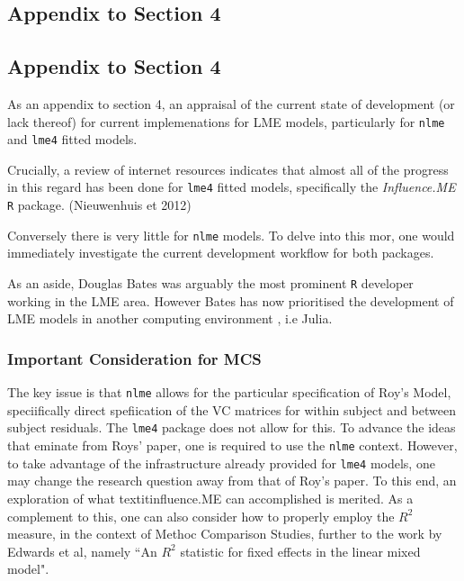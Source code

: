 \documentclass[12pt, a4paper]{article}
\begin{document}
\subsection*{Appendix to Section 4}



\subsection*{Appendix to Section 4}

As an appendix to section 4, an appraisal of the current state of development (or lack thereof) for current implemenations for LME models, particularly for
\texttt{nlme} and \texttt{lme4} fitted models.

Crucially, a review of internet resources indicates that almost all of the progress in this regard has been done for \texttt{lme4} fitted models, specifically the \textit{Influence.ME} \texttt{R} package. (Nieuwenhuis et 2012)

Conversely there is very little for \texttt{nlme} models. To delve into this mor, one would immediately investigate the current development workflow for both packages.

As an aside, Douglas Bates was arguably the most prominent \texttt{R} developer working in the LME area. 
However Bates has now prioritised the development of LME models in another computing environment , i.e Julia. 


\subsubsection*{Important Consideration for MCS}

The key issue is that \texttt{nlme} allows for the particular specification of Roy's Model, speciifically direct spefiication of the VC matrices for within subject and between subject residuals.
The \texttt{lme4} package does not allow for this.
To advance the ideas that eminate from Roys' paper, one is required to use the \texttt{nlme} context. However, to take advantage of the infrastructure already provided for \texttt{lme4} models, one may change the research question away from that of Roy's paper. 
To this end, an exploration of what textit{influence.ME} can accomplished is merited.
As a complement to this, one can also consider how to properly employ the $R^2$ measure, in the context of Methoc Comparison Studies, further to the work by Edwards et al, namely ``An $R^2$ statistic for fixed effects in the linear mixed model".
\end{document}
